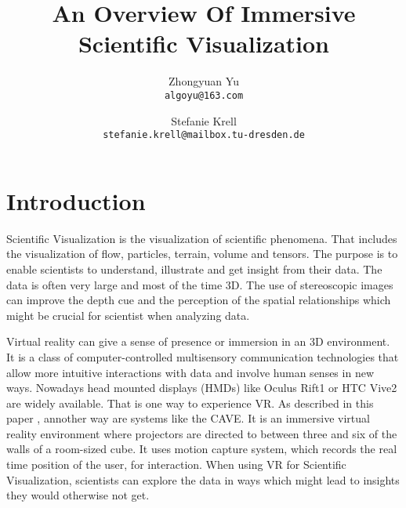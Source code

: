 \documentclass[10pt,twocolumn,letterpaper]{article}
\begin{document}
\title{An Overview Of Immersive Scientific Visualization}

\author{Zhongyuan Yu\\
{\tt\small algoyu@163.com}
\and
Stefanie Krell\\
{\tt\small stefanie.krell@mailbox.tu-dresden.de}
}

\maketitle


\section{Introduction}

Scientific Visualization is the visualization of scientific phenomena. That includes the visualization of flow, particles, terrain, volume and tensors. The purpose is to enable scientists to understand, illustrate and get insight from their data. The data is often very large and most of the time 3D.  The use of stereoscopic images can improve the depth cue and the perception of the spatial relationships which might be crucial for scientist when analyzing data. 


\setlength{\parindent}{1pc}
Virtual reality can give a sense of presence or immersion in an 3D environment. It is a class of computer-controlled multisensory communication technologies that allow more intuitive interactions with data and involve human senses in new ways. Nowadays head mounted displays (HMDs) like Oculus Rift1 or HTC Vive2 are widely available. That is one way to experience VR. As described in this paper \cite{Wiebrands2018}, annother way are systems like the CAVE. It is an immersive virtual reality environment where projectors are directed to between three and six of the walls of a room-sized cube. It uses motion capture system, which records the real time position of the user, for interaction. When using VR for Scientific Visualization, scientists can explore the data in ways which might lead to insights they would otherwise not get. 
\end{document}
